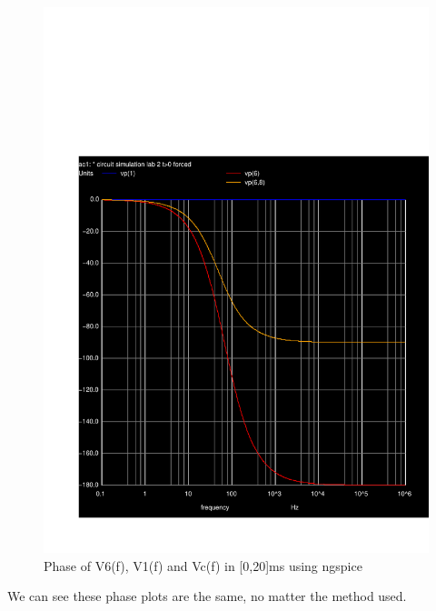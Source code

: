   \begin{figure}[H] \centering
\includegraphics[width=0.4\linewidth]{../sim/phs.pdf}
\caption{Phase of V6(f), V1(f) and Vc(f) in [0,20]ms using ngspice}
\label{fig:ff}
\end{figure}
We can see these phase plots are the same, no matter the method used.
